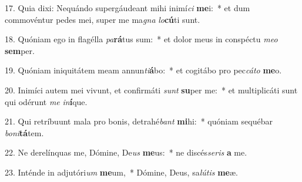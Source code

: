 17. Quia dixi: Nequándo supergáudeant mihi inimí\textit{ci} \textbf{me}i:~*  et dum commovéntur pedes mei, super me ma\textit{gna} \textit{lo}\textbf{cú}ti sunt.\

18. Quóniam ego in flagélla \textit{pa}\textbf{rá}tus sum:~*  et dolor meus in conspéctu \textit{me}\textit{o} \textbf{sem}per.\

19. Quóniam iniquitátem meam annun\textit{ti}\textbf{á}bo:~*  et cogitábo pro pec\textit{cá}\textit{to} \textbf{me}o.\

20. Inimíci autem mei vivunt, et confirmáti \textit{sunt} \textbf{su}per me:~*  et multiplicáti sunt qui odérunt \textit{me} \textit{in}\textbf{í}que.\

21. Qui retríbuunt mala pro bonis, detrahé\textit{bant} \textbf{mi}hi:~*  quóniam sequébar \textit{bo}\textit{ni}\textbf{tá}tem.\

22. Ne derelínquas me, Dómine, De\textit{us} \textbf{me}us:~*  ne discés\textit{se}\textit{ris} \textbf{a} me.\

23. Inténde in adjutóri\textit{um} \textbf{me}um,~*  Dómine, Deus, sa\textit{lú}\textit{tis} \textbf{me}æ.\


